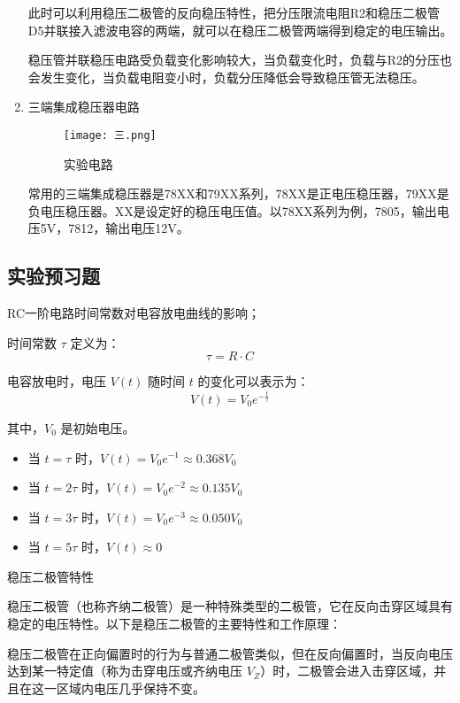 \documentclass[dvipsnames, svgnames,a4paper,11pt]{article}
\begin{document}
\begin{enumerate}
		此时可以利用稳压二极管的反向稳压特性，把分压限流电阻R2和稳压二极管D5并联接入滤波电容的两端，就可以在稳压二极管两端得到稳定的电压输出。

稳压管并联稳压电路受负载变化影响较大，当负载变化时，负载与R2的分压也会发生变化，当负载电阻变小时，负载分压降低会导致稳压管无法稳压。

		\item 三端集成稳压器电路

		\begin{figure}[{H}]
			\centering
			\texttt{[image: 三.png]}
			\caption{实验电路}
			\label{}
		\end{figure}
		常用的三端集成稳压器是78XX和79XX系列，78XX是正电压稳压器，79XX是负电压稳压器。XX是设定好的稳压电压值。以78XX系列为例，7805，输出电压5V，7812，输出电压12V。
	\end{enumerate}
	
	
	
	\subsection{实验预习题}
	
	\begin{question}
	RC一阶电路时间常数对电容放电曲线的影响；
	\end{question}
时间常数 $\tau$ 定义为：
\[
\tau = R \cdot C
\]

电容放电时，电压 $V(t)$ 随时间 $t$ 的变化可以表示为：
\[
V(t) = V_0 e^{-\frac{t}{\tau}}
\]

其中，$V_0$ 是初始电压。

\begin{itemize}
    \item 当 $t = \tau$ 时，$V(t) = V_0 e^{-1} \approx 0.368 V_0$
    \item 当 $t = 2\tau$ 时，$V(t) = V_0 e^{-2} \approx 0.135 V_0$
    \item 当 $t = 3\tau$ 时，$V(t) = V_0 e^{-3} \approx 0.050 V_0$
    \item 当 $t = 5\tau$ 时，$V(t) \approx 0$
\end{itemize}


	\begin{question}
		稳压二极管特性
	\end{question}
稳压二极管（也称齐纳二极管）是一种特殊类型的二极管，它在反向击穿区域具有稳定的电压特性。以下是稳压二极管的主要特性和工作原理：

稳压二极管在正向偏置时的行为与普通二极管类似，但在反向偏置时，当反向电压达到某一特定值（称为击穿电压或齐纳电压 $V_Z$）时，二极管会进入击穿区域，并且在这一区域内电压几乎保持不变。
\end{document}
